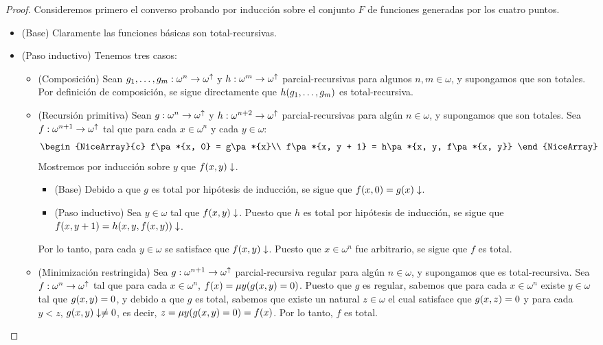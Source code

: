 \begin{proof}
	Consideremos primero el converso probando por inducción sobre el conjunto $F$ de funciones generadas por los cuatro puntos.

	\begin{itemize}
		\item (Base) Claramente las funciones básicas son total-recursivas.

		\item (Paso inductivo) Tenemos tres casos:

		\begin{itemize}
			\item (Composición) Sean $g_{1},\dotsc, g_{m}:\omega^{n}\to\omega^{\uparrow}$ y $h:\omega^{m}\to\omega^{\uparrow}$ parcial-recursivas para algunos $n, m\in\omega$, y supongamos que son totales. Por definición de composición, se sigue directamente que $h\pa*{g_{1},\dotsc, g_{m}}$ es total-recursiva.

			\item (Recursión primitiva) Sean $g:\omega^{n}\to\omega^{\uparrow}$ y $h:\omega^{n + 2}\to\omega^{\uparrow}$ parcial-recursivas para algún $n\in\omega$, y supongamos que son totales. Sea $f:\omega^{n + 1}\to\omega^{\uparrow}$ tal que para cada $x\in\omega^{n}$ y cada $y\in\omega$:
			\[
				\begin{NiceArray}{c}
					f\pa*{x, 0} = g\pa*{x}\\
					f\pa*{x, y + 1} = h\pa*{x, y, f\pa*{x, y}}
				\end{NiceArray}
			\]
			Mostremos por inducción sobre $y$ que $f\pa*{x, y}\ACABA$.
			\begin{itemize}
				\item (Base) Debido a que $g$ es total por hipótesis de inducción, se sigue que $f\pa*{x, 0} = g\pa*{x}\ACABA$.
				\item (Paso inductivo) Sea $y\in\omega$ tal que $f\pa*{x, y}\ACABA$. Puesto que $h$ es total por hipótesis de inducción, se sigue que $f\pa*{x, y + 1} = h\pa*{x, y, f\pa*{x, y}}\ACABA$.
			\end{itemize}
			Por lo tanto, para cada $y\in\omega$ se satisface que $f\pa*{x, y}\ACABA$. Puesto que $x\in\omega^{n}$ fue arbitrario, se sigue que $f$ es total.

			\item (Minimización restringida) Sea $g:\omega^{n + 1}\to\omega^{\uparrow}$ parcial-recursiva regular para algún $n\in\omega$, y supongamos que es total-recursiva. Sea $f:\omega^{n}\to\omega^{\uparrow}$ tal que para cada $x\in\omega^{n}$, $f\pa*{x} =\mu y\pa*{g\pa*{x, y} = 0}$. Puesto que $g$ es regular, sabemos que para cada $x\in\omega^{n}$ existe $y\in\omega$ tal que $g\pa*{x, y} = 0$, y debido a que $g$ es total, sabemos que existe un natural $z\in\omega$ el cual satisface que $g\pa*{x, z} = 0$ y para cada $y < z$, $g\pa*{x, y}\ACABA\neq 0$, es decir, $z =\mu y\pa*{g\pa*{x, y} = 0} = f\pa*{x}$. Por lo tanto, $f$ es total.
		\end{itemize}
	\end{itemize}


\end{proof}
